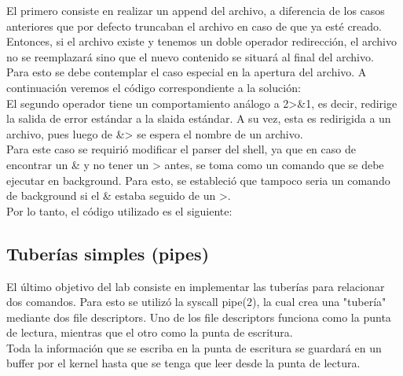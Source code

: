 \documentclass[a4paper, 12pt]{article}
\begin{document}
		El primero consiste en realizar un append del archivo, a diferencia de los casos anteriores que por defecto truncaban el archivo en caso de que ya esté creado. Entonces, si el archivo existe y tenemos un doble operador redirección, el archivo no se reemplazará sino que el nuevo contenido se situará al final del archivo.\\
		Para esto se debe contemplar el caso especial en la apertura del archivo. A continuación veremos el código correspondiente a la solución:\\
		
		
		El segundo operador tiene un comportamiento análogo a 2>\&1, es decir, redirige la salida de error estándar a la slaida estándar. A su vez, esta es redirigida a un archivo, pues luego de \&> se espera el nombre de un archivo.\\
		Para este caso se requirió modificar el parser del shell, ya que en caso de encontrar un \& y no tener un > antes, se toma como un comando que se debe ejecutar en background. Para esto, se estableció que tampoco seria un comando de background si el \& estaba seguido de un >.\\
		Por lo tanto, el código utilizado es el siguiente:\\
		
		\bigskip\bigskip\bigskip
		
		
		\subsection{Tuberías simples (pipes)}
		El último objetivo del lab consiste en implementar las tuberías para relacionar dos comandos. Para esto se utilizó la syscall pipe(2), la cual crea una "tubería" mediante dos file descriptors. Uno de los file descriptors funciona como la punta de lectura, mientras que el otro como la punta de escritura.\\
		Toda la información que se escriba en la punta de escritura se guardará en un buffer por el kernel hasta que se tenga que leer desde la punta de lectura.\\
		
\end{document}
